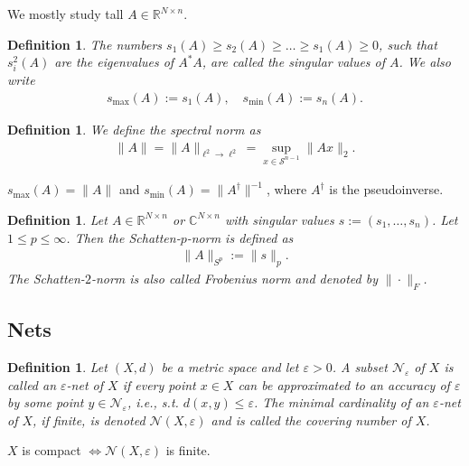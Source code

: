 \documentclass[13pt]{article}
\theoremstyle{plain}
\newtheorem{defi}[thm]{Definition}
\newcommand{\R}{\mathbb{R}}
\newcommand{\C}{\mathbb{C}}
\newcommand{\NN}{\mathcal{N}}
\renewcommand{\S}{\mathcal{S}}
\begin{document}
We mostly study tall $A \in \R^{N \times n}$.

\begin{defi}
    The numbers $s_1(A) \ge s_2(A) \ge \ldots \ge s_1(A) \ge 0$, such that
    $s_i^2(A)$ are the eigenvalues of $A^\ast A$, are called the \emph{singular values} of $A$.
    We also write
    \[
        \begin{aligned}
            s_{\max}(A) := s_1(A), \quad s_{\min}(A) := s_n(A) .
        \end{aligned}
    \] 
\end{defi} 

\begin{defi}
    We define the \emph{spectral norm} as
    \[
        \begin{aligned}
            \|A\| = \|A\|_{\ell^2 \to \ell^2} = \sup_{x \in \S^{n-1}} \|Ax\|_2.
        \end{aligned}
    \] 
\end{defi} 

$s_{\max}(A) = \|A\|$ and $s_{\min}(A) = \|A^\dagger\|^{-1}$, where $A^\dagger$ is the pseudoinverse.

\begin{defi}
    Let $A \in \R^{N \times n}$ or $\C^{N \times n}$ with singular values $s := (s_1,\ldots,s_n)$.
    Let $1 \le p \le \infty$. Then the \emph{Schatten-$p$-norm} is defined as
    \[
        \begin{aligned}
            \|A\|_{S^p} := \|s\|_p.
        \end{aligned}
    \]
    The Schatten-$2$-norm is also called \emph{Frobenius norm} and denoted by $\|\cdot\|_F$.
\end{defi}

\subsection{Nets}

\begin{defi}
    Let $(X,d)$ be a metric space and let $\varepsilon > 0$.
    A subset $\NN_\varepsilon$ of $X$ is called an \emph{$\varepsilon$-net} of $X$ if
    every point $x \in X$ can be approximated to an accuracy of $\varepsilon$ by
    some point $y \in \NN_\varepsilon$, i.e., s.t. $d(x,y) \le \varepsilon$.
    The minimal cardinality of an $\varepsilon$-net of $X$, if finite, is
    denoted $\NN(X,\varepsilon)$ and is called the \emph{covering number} of $X$.
\end{defi}

$X$ is compact $\iff \NN(X,\varepsilon)$ is finite.

\newpage

\printbibliography[heading=bibintoc]
\end{document}
